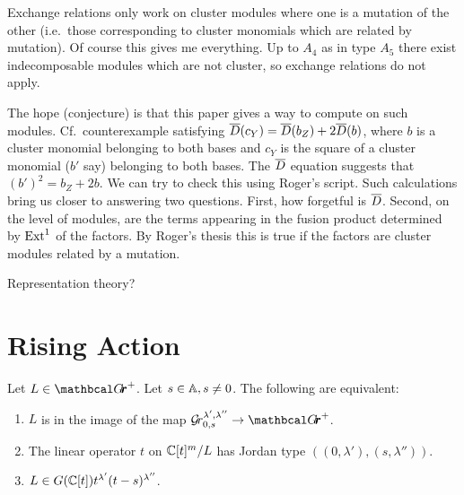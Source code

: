\documentclass[draft]{article}
\begin{document}
Exchange relations only work on cluster modules where one is a mutation of the other (i.e.\ those corresponding to cluster monomials which are related by mutation). Of course this gives me everything. Up to $A_4$ as in type $A_5$ there exist indecomposable modules which are not cluster, so exchange relations do not apply. 

The hope (conjecture) is that this paper gives a way to compute on such modules. Cf.\ counterexample satisfying $\barD(c_Y) = \barD(b_Z) + 2\barD(b)$, where $b$ is a cluster monomial belonging to both bases and $c_Y$ is the square of a cluster monomial ($b'$ say) belonging to both bases. The $\barD$ equation suggests that $(b')^2 = b_Z + 2b$. We can try to check this using Roger's script. Such calculations bring us closer to answering two questions. First, how forgetful is $\barD$. Second, on the level of modules, are the terms appearing in the fusion product determined by $\Ext^1$ of the factors. By Roger's thesis this is true if the factors are cluster modules related by a mutation. 


Representation theory? 

\section{Rising Action} %

\begin{lemma} \label{le:Grl1l2}
    Let $ L \in \Grth^+ $.  Let $ s \in \AA, s \ne 0 $.  The following are equivalent:
    \begin{enumerate}
        \item $ L $ is in the image of the map $ \Gr^{\lambda', \lambda''}_{0,s} \rightarrow \Grth^+$. %
        \item The linear operator $ t $ on $ \CC[t]^m/L$ has Jordan type $((0,\lambda'), (s,\lambda''))$.
        \item $ L \in G(\CC[t]) t^{\lambda'} (t-s)^{\lambda''}$.
    \end{enumerate}
\end{lemma}
\end{document}
